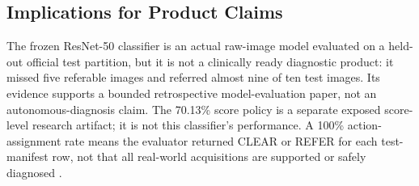 \documentclass{ieeeaccess}
\begin{document}
\subsection{Implications for Product Claims}
The frozen ResNet-50 classifier is an actual raw-image model evaluated on a held-out official test partition, but it is not a clinically ready diagnostic product: it missed five referable images and referred almost nine of ten test images. Its evidence supports a bounded retrospective model-evaluation paper, not an autonomous-diagnosis claim. The 70.13\% score policy is a separate exposed score-level research artifact; it is not this classifier's performance. A 100\% action-assignment rate means the evaluator returned CLEAR or REFER for each test-manifest row, not that all real-world acquisitions are supported or safely diagnosed \cite{openaiChatGPT}.
\end{document}
